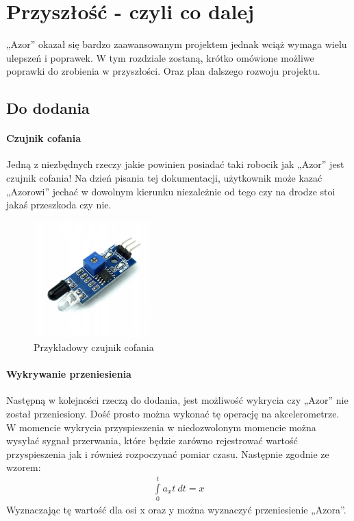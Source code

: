 \section{Przyszłość - czyli co dalej}
    \tab „Azor” okazał się bardzo zaawansowanym projektem jednak wciąż wymaga wielu ulepszeń i poprawek.
    W tym rozdziale zostaną, krótko omówione możliwe poprawki do zrobienia w przyszłości. Oraz plan dalszego rozwoju projektu.

    \subsection{Do dodania}
        \paragraph{Czujnik cofania\\}
        Jedną z niezbędnych rzeczy jakie powinien posiadać taki robocik jak „Azor” jest czujnik cofania!
        Na dzień pisania tej dokumentacji, użytkownik może kazać „Azorowi” jechać w dowolnym kierunku niezależnie od tego czy na drodze stoi jakaś przeszkoda czy nie.
        \begin{figure}[!h]
            \centering
            \includegraphics[width = 0.4\textwidth]{Img/czujnik_odleglosci_odbiciowy.jpeg}
            \caption{Przykładowy czujnik cofania}
        \end{figure}


        \paragraph{Wykrywanie przeniesienia\\}
        Następną w kolejności rzeczą do dodania, jest możliwość wykrycia czy „Azor” nie został przeniesiony.
        Dość prosto można wykonać tę operację na akcelerometrze. 
        W momencie wykrycia przyspieszenia w niedozwolonym momencie można wysyłać sygnał przerwania, które będzie zarówno rejestrować wartość przyspieszenia jak i również rozpoczynać pomiar czasu.
        Następnie zgodnie ze wzorem:
        \begin{align}
            \int\limits_0^t a_xt\ dt = x
        \end{align}
        Wyznaczając tę wartość dla osi x oraz y można wyznaczyć przeniesienie „Azora”.

